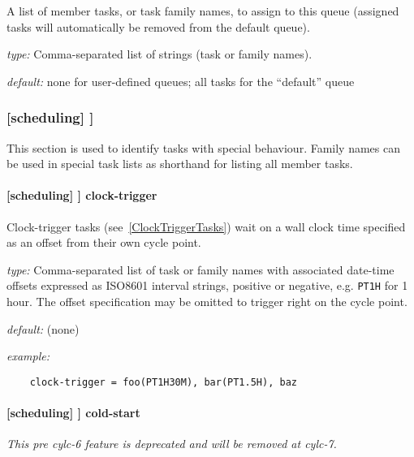 A list of member tasks, or task family names, to assign to this queue
(assigned tasks will automatically be removed from the default queue).
\begin{myitemize}
\item {\em type:} Comma-separated list of strings (task or family names).
\item {\em default:} none for user-defined queues; all tasks for the ``default'' queue
\end{myitemize}

\subsubsection[{[[}special tasks{]]}]{[scheduling] \textrightarrow [[special tasks]]}

This section is used to identify tasks with special behaviour. Family names can
be used in special task lists as shorthand for listing all member tasks.

\paragraph[clock-trigger]{[scheduling] \textrightarrow [[special tasks]] \textrightarrow clock-trigger}

Clock-trigger tasks (see~\ref{ClockTriggerTasks}) wait on a wall clock time
specified as an offset from their own cycle point.

\begin{myitemize}
    \item {\em type:} Comma-separated list of task or family names with
        associated date-time offsets expressed as ISO8601 interval strings,
        positive or negative, e.g. \lstinline=PT1H= for 1 hour.  The offset
        specification may be omitted to trigger right on the cycle point.
    \item {\em default:} (none)
    \item {\em example:}
\begin{lstlisting}
    clock-trigger = foo(PT1H30M), bar(PT1.5H), baz
\end{lstlisting}
\end{myitemize}

\paragraph[cold-start]{[scheduling] \textrightarrow [[special tasks]] \textrightarrow cold-start}

{\em This pre cylc-6 feature is deprecated and will be removed at cylc-7.}

